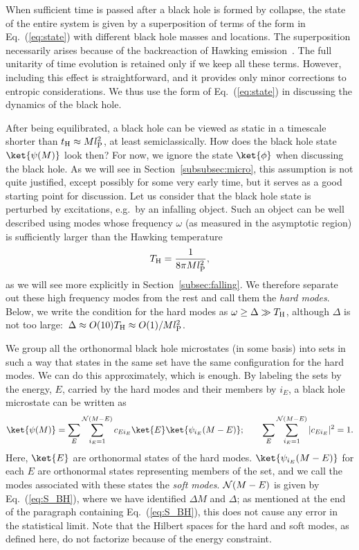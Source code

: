 \documentclass[12pt]{article}
\begin{document}
When sufficient time is passed after a black hole is formed by 
collapse, the state of the entire system is given by a superposition 
of terms of the form in Eq.~(\ref{eq:state}) with different black 
hole masses and locations.  The superposition necessarily arises 
because of the backreaction of Hawking emission~\cite{Page:1979tc,%
Nomura:2012cx}.  The full unitarity of time evolution is retained 
only if we keep all these terms.  However, including this effect is 
straightforward, and it provides only minor corrections to entropic 
considerations.  We thus use the form of Eq.~(\ref{eq:state}) in 
discussing the dynamics of the black hole.

After being equilibrated, a black hole can be viewed as static in 
a timescale shorter than $t_{\rm H} \approx M l_{\rm P}^2$, at least 
semiclassically.  How does the black hole state $\ket{\psi(M)}$ look 
then?  For now, we ignore the state $\ket{\phi}$ when discussing the 
black hole.  As we will see in Section~\ref{subsubsec:micro}, this 
assumption is not quite justified, except possibly for some very 
early time, but it serves as a good starting point for discussion. 
Let us consider that the black hole state is perturbed by 
excitations, e.g.\ by an infalling object.  Such an object 
can be well described using modes whose frequency $\omega$ 
(as measured in the asymptotic region) is sufficiently larger 
than the Hawking temperature
%
\begin{equation}
  T_{\rm H} = \frac{1}{8\pi M l_{\rm P}^2},
\label{eq:T_H}
\end{equation}
%
as we will see more explicitly in Section~\ref{subsec:falling}. 
We therefore separate out these high frequency modes from the rest 
and call them the {\it hard modes}.  Below, we write the condition 
for the hard modes as $\omega \geq \Delta \gg T_{\rm H}$, although 
$\Delta$ is not too large:\ $\Delta \approx O(10)T_{\rm H} \approx 
O(1)/M l_{\rm P}^2$.

We group all the orthonormal black hole microstates (in some basis) 
into sets in such a way that states in the same set have the same 
configuration for the hard modes.  We can do this approximately, 
which is enough.  By labeling the sets by the energy, $E$, carried 
by the hard modes and their members by $i_E$, a black hole microstate 
can be written as
%
\begin{equation}
  \ket{\psi(M)} = \sum_E \sum_{i_E = 1}^{{\cal N}(M-E)} 
      c_{E i_E} \ket{E} \ket{\psi_{i_E}(M-E)};
\qquad
  \sum_E \sum_{i_E = 1}^{{\cal N}(M-E)} |c_{E i_E}|^2 = 1.
\label{eq:BH-states}
\end{equation}
%
Here, $\ket{E}$ are orthonormal states of the hard modes.  
$\ket{\psi_{i_E}(M-E)}$ for each $E$ are orthonormal states 
representing members of the set, and we call the modes associated 
with these states the {\it soft modes}.  ${\cal N}(M-E)$ is given 
by Eq.~(\ref{eq:S_BH}), where we have identified $\varDelta M$ 
and $\Delta$; as mentioned at the end of the paragraph containing 
Eq.~(\ref{eq:S_BH}), this does not cause any error in the 
statistical limit.  Note that the Hilbert spaces for the hard 
and soft modes, as defined here, do not factorize because of 
the energy constraint.
\end{document}
